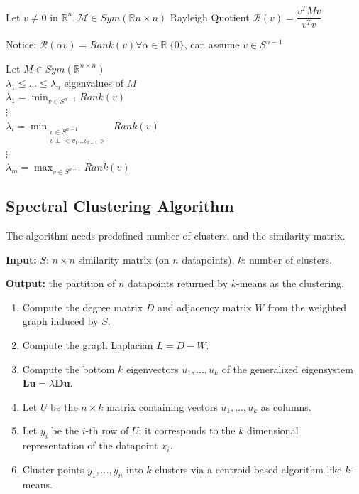 {	\begin{definition}
		Let $v \neq 0 $ in $\mathbb R^n, \mathcal M \in Sym(\mathbb R{n \times n})$
		Rayleigh Quotient
		$\mathcal R(v) = \dfrac{v^T M v}{v^Tv}$
		
		Notice: $\mathcal R(\alpha v) = Rank(v) \forall \alpha \in \mathbb R \ \{0\}$, can assume $v \in S^{n-1}$
	\end{definition}
	
	
	\begin{theorem}
		Let $M \in Sym(\mathbb R^{n\times n})$\\
		$\lambda_1 \leq ... \leq \lambda_n$ eigenvalues of $M$ \\
		$\lambda_1 = \min_{v \in S^{n-1}} Rank (v)$\\
		$\vdots$ \\
		$\lambda_i = \min_{\substack{ v \in S^{n-1}\\
				v \perp < v_1 ... v_{i-1} >}} Rank (v)$ \\
		$\vdots$ \\
		$\lambda_m = \max_{v \in S^{n-1}} Rank (v)$
	\end{theorem}
	
	\subsection{Spectral Clustering Algorithm}
	
	The algorithm needs predefined number of clusters, and the similarity matrix.
	
	\textbf{Input:} $S$: $n\times n$ similarity matrix (on $n$ datapoints), $k$: number of clusters.
	
	\textbf{Output:} the partition of $n$ datapoints returned by $k$-means as the clustering.
	
	\begin{enumerate}
		\item Compute the degree matrix $D$ and adjacency matrix $W$ from the weighted graph induced by $S$.
		\item Compute the graph Laplacian $L = D - W$.
		\item Compute the bottom $k$ eigenvectors $u_1,\ldots,u_k$ of the generalized eigensystem $\mathbf{Lu} = \lambda \mathbf{Du}$.
		\item Let $U$ be the $n \times k$ matrix containing vectors $u_1,\ldots,u_k$ as columns.
		\item Let $y_i$ be the $i$-th row of $U$; it corresponds to the $k$ dimensional representation of the datapoint $x_i$.
		\item Cluster points $y_1,\ldots,y_n$ into $k$ clusters via a centroid-based algorithm like $k$-means.
	\end{enumerate}
	
}
